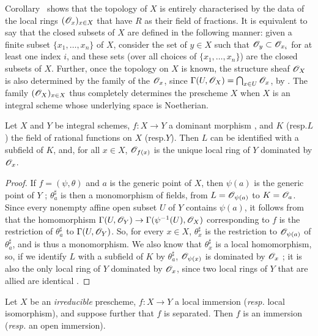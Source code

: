 \begin{env}[8.2.6]
\label{1.8.2.6}
Corollary~ shows that the topology of $X$ is entirely characterised by the data of the local rings $(\mathscr{O}_x)_{x\in X}$ that have $R$ as their field of fractions.
It is equivalent to say that the closed subsets of $X$ are defined in the following manner: given a finite subset $\{x_1,\ldots,x_n\}$ of $X$, consider the set of $y\in X$ such that $\mathscr{O}_y\subset\mathscr{O}_{x_i}$ for at least one index $i$, and these sets (over all choices of $\{x_1,\ldots,x_n\}$) are the closed subsets of $X$.
Further, once the topology on $X$ is known, the structure sheaf $\mathscr{O}_X$ is also determined by the family of the $\mathscr{O}_x$, since $\Gamma(U,\mathscr{O}_X)=\bigcap_{x\in U}\mathscr{O}_x$, by .
The family $(\mathscr{O}_X)_{x\in X}$ thus completely determines the prescheme $X$ when $X$ is an integral scheme whose underlying space is Noetherian.
\end{env}

\begin{prop}[8.2.7]
\label{1.8.2.7}
Let $X$ and $Y$ be integral schemes, $f:X\to Y$ a dominant morphism , and $K$ (resp.$L$) the field of rational functions on $X$ (resp.$Y$).
Then $L$ can be identified with a subfield of $K$, and, for all $x\in X$, $\mathscr{O}_{f(x)}$ is the unique local ring of $Y$ dominated by $\mathscr{O}_x$.
\end{prop}

\begin{proof}
\label{proof-1.8.2.7}
If $f=(\psi,\theta)$ and $a$ is the generic point of $X$, then $\psi(a)$ is the generic point of $Y$ ;
$\theta_a^\sharp$ is then a monomorphism of fields, from $L=\mathscr{O}_{\psi(a)}$ to $K=\mathscr{O}_a$.
Since every nonempty affine open subset $U$ of $Y$ contains $\psi(a)$, it follows from  that the homomorphism $\Gamma(U,\OO_Y)\to\Gamma(\psi^{-1}(U),\OO_X)$ corresponding to $f$ is the restriction of $\theta_a^\sharp$ to $\Gamma(U,\mathscr{O}_Y)$.
So, for every $x\in X$, $\theta_x^\sharp$ is the restriction to $\mathscr{O}_{\psi(a)}$ of $\theta_a^\sharp$, and is thus a monomorphism.
We also know that $\theta_x^\sharp$ is a local homomorphism, so, if we identify $L$ with a subfield of $K$ by $\theta_a^\sharp$, $\mathscr{O}_{\psi(x)}$ is dominated by $\mathscr{O}_x$ ;
it is also the only local ring of $Y$ dominated by $\mathscr{O}_x$, since two local rings of $Y$ that are allied are identical .
\end{proof}

\begin{prop}[8.2.8]
\label{1.8.2.8}
Let $X$ be an \emph{irreducible} prescheme, $f:X\to Y$ a local immersion (\emph{resp.} local isomorphism), and suppose further that $f$ is separated. Then $f$ is an immersion (\emph{resp.} an open immersion).
\end{prop}

